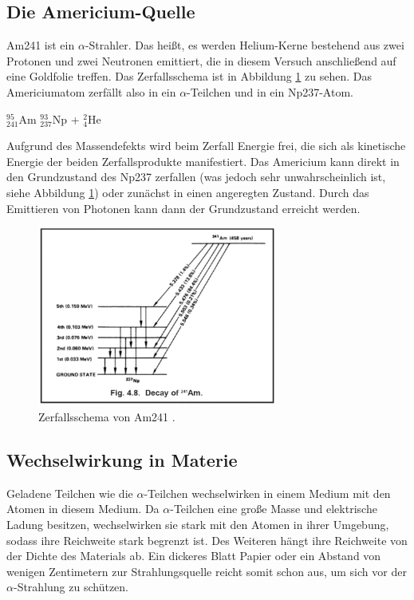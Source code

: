 \subsection{Die Americium-Quelle}

Am241 ist ein $\alpha$-Strahler. Das heißt, es werden Helium-Kerne bestehend aus zwei Protonen und zwei Neutronen emittiert,
die in diesem Versuch anschließend auf eine Goldfolie treffen. Das Zerfallsschema ist in Abbildung \ref{fig:zerfall} zu sehen.
Das Americiumatom zerfällt also in ein $\alpha$-Teilchen und in ein Np237-Atom.

\begin{center}
  $^{95}_{241}$Am \rightarrow $^{93}_{237}$Np + $^{2}_{4}$He
\end{center}

Aufgrund des Massendefekts wird beim Zerfall Energie frei, die sich als kinetische Energie der beiden Zerfallsprodukte
manifestiert. Das Americium kann direkt in den Grundzustand des Np237 zerfallen (was jedoch sehr unwahrscheinlich ist, siehe Abbildung
\ref{fig:zerfall}) oder zunächst in einen angeregten Zustand. Durch das Emittieren von Photonen kann dann der Grundzustand
erreicht werden.

\begin{figure}
\centering
\includegraphics[width=0.7\textwidth]{zerfall.png}
\caption{Zerfallsschema von Am241 \cite{gsi}.}
\label{fig:zerfall}
\end{figure}

\subsection{Wechselwirkung in Materie}

Geladene Teilchen wie die $\alpha$-Teilchen wechselwirken in einem Medium mit den Atomen in diesem Medium. Da $\alpha$-Teilchen
eine große Masse und elektrische Ladung besitzen, wechselwirken sie stark mit den Atomen in ihrer Umgebung, sodass ihre
Reichweite stark begrenzt ist. Des Weiteren hängt ihre Reichweite von der Dichte des Materials ab.
Ein dickeres Blatt Papier oder ein Abstand von wenigen Zentimetern zur Strahlungsquelle reicht somit schon aus, um sich vor der
$\alpha$-Strahlung zu schützen.

